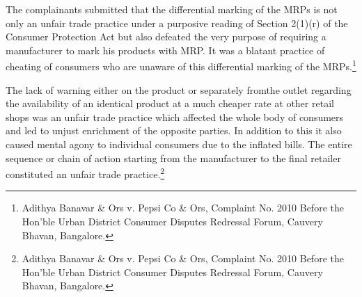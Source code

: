 \begin{multicols}{2}
\noi
The complainants submitted that the differential marking of the MRPs is not only an unfair
trade practice under a purposive reading of Section 2(1)(r) of the Consumer Protection Act but
also defeated the very purpose of requiring a manufacturer to mark his products with MRP. It
was a blatant practice of cheating of consumers who are unaware of this differential marking
of the MRPs.\footnote{Adithya Banavar \& Ors v. Pepsi Co \& Ors, Complaint No. 2010 Before the Hon’ble Urban District Consumer Disputes Redressal Forum, Cauvery Bhavan, Bangalore.}

\noi
The lack of warning either on the product or separately fromthe outlet regarding the availability
of an identical product at a much cheaper rate at other retail shops was an unfair trade practice
which affected the whole body of consumers and led to unjust enrichment of the opposite
parties. In addition to this it also caused mental agony to individual consumers due to the
inflated bills. The entire sequence or chain of action starting from the manufacturer to the final
retailer constituted an unfair trade practice.\footnote{Adithya Banavar \& Ors v. Pepsi Co \& Ors, Complaint No. 2010 Before the Hon’ble Urban District Consumer Disputes Redressal Forum, Cauvery Bhavan, Bangalore.}


\end{multicols}
